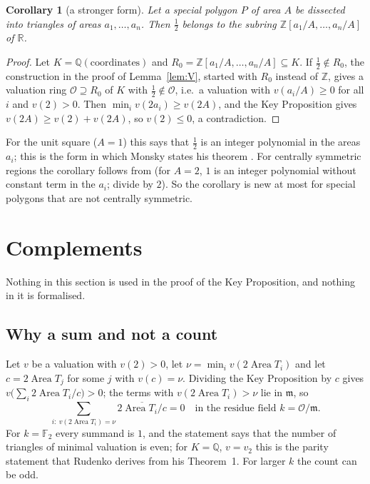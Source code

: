 \documentclass[11pt]{article}
\newtheorem{corollary}[theorem]{Corollary}
\theoremstyle{definition}
\newcommand{\Q}{\mathbb{Q}}
\newcommand{\Z}{\mathbb{Z}}
\newcommand{\R}{\mathbb{R}}
\newcommand{\F}{\mathbb{F}}
\newcommand{\cO}{\mathcal{O}}
\newcommand{\m}{\mathfrak{m}}
\newcommand{\Area}{\operatorname{Area}}
\begin{document}
\begin{corollary}[a stronger form]\label{cor:strong}
Let a special polygon $P$ of area $A$ be dissected into triangles of areas $a_1,\dots,a_n$. Then
$\tfrac12$ belongs to the subring $\Z[a_1/A,\dots,a_n/A]$ of $\R$.
\end{corollary}

\begin{proof}
Let $K=\Q(\text{coordinates})$ and $R_0=\Z[a_1/A,\dots,a_n/A]\subseteq K$. If $\tfrac12\notin R_0$,
the construction in the proof of Lemma~\ref{lem:V}, started with $R_0$ instead of $\Z$, gives a
valuation ring $\cO\supseteq R_0$ of $K$ with $\tfrac12\notin\cO$, i.e.\ a valuation with
$v(a_i/A)\ge0$ for all $i$ and $v(2)>0$. Then $\min_iv(2a_i)\ge v(2A)$, and the Key Proposition gives
$v(2A)\ge v(2)+v(2A)$, so $v(2)\le0$, a contradiction.
\end{proof}

For the unit square ($A=1$) this says that $\tfrac12$ is an integer polynomial in the areas $a_i$;
this is the form in which Monsky states his theorem \cite[pp.~161--162]{Mon70}. For centrally
symmetric regions the corollary follows from \cite[Theorem 3.10]{Mon90} (for $A=2$, $1$ is an
integer polynomial without constant term in the $a_i$; divide by $2$). So the corollary is new at
most for special polygons that are not centrally symmetric.

\section{Complements}\label{sec:compl}

Nothing in this section is used in the proof of the Key Proposition, and nothing in it is formalised.

\subsection{Why a sum and not a count}

Let $v$ be a valuation with $v(2)>0$, let $\nu=\min_iv(2\Area T_i)$ and let $c=2\Area T_j$ for some
$j$ with $v(c)=\nu$. Dividing the Key Proposition by $c$ gives $v\bigl(\sum_i2\Area T_i/c\bigr)>0$;
the terms with $v(2\Area T_i)>\nu$ lie in $\m$, so
\[ \sum_{i:\ v(2\Area T_i)=\nu}\overline{2\Area T_i/c}=0\quad\text{in the residue field }k=\cO/\m. \]
For $k=\F_2$ every summand is $1$, and the statement says that the number of triangles of minimal
valuation is even; for $K=\Q$, $v=v_2$ this is the parity statement that Rudenko derives from his
Theorem~1. For larger $k$ the count can be odd.
\end{document}
